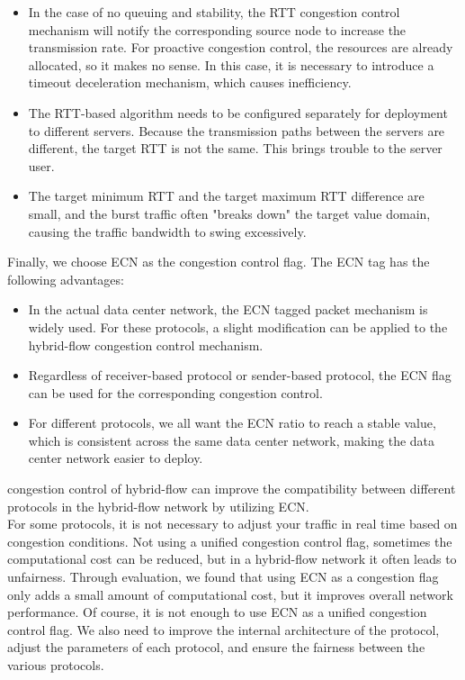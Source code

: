 \documentclass[conference]{IEEEtran}
\begin{document}
\begin{itemize}
\item  In the case of no queuing and stability, the RTT congestion control mechanism will notify the corresponding source node to increase the transmission rate. For proactive congestion control, the resources are already allocated, so it makes no sense. In this case, it is necessary to introduce a timeout deceleration mechanism, which causes inefficiency.
\item The RTT-based algorithm needs to be configured separately for deployment to different servers. Because the transmission paths between the servers are different, the target RTT is not the same. This brings trouble to the server user.
\item The target minimum RTT and the target maximum RTT difference are small, and the burst traffic often "breaks down" the target value domain, causing the traffic bandwidth to swing excessively.
\end{itemize}
\indent Finally, we choose ECN as the congestion control flag. The ECN tag has the following advantages:
\begin{itemize}
\item In the actual data center network, the ECN tagged packet mechanism is widely used. For these protocols, a slight modification can be applied to the hybrid-flow congestion control mechanism.
\item Regardless of receiver-based protocol or sender-based protocol, the ECN flag can be used for the corresponding congestion control.
\item For different protocols, we all want the ECN ratio to reach a stable value, which is consistent across the same data center network, making the data center network easier to deploy.
\end{itemize}
\indent congestion control of hybrid-flow can improve the compatibility between different protocols in the hybrid-flow network by utilizing ECN.\\
\indent For some protocols, it is not necessary to adjust your traffic in real time based on congestion conditions. Not using a unified congestion control flag, sometimes the computational cost can be reduced, but in a hybrid-flow network it often leads to unfairness. Through evaluation, we found that using ECN as a congestion flag only adds a small amount of computational cost, but it improves overall network performance. Of course, it is not enough to use ECN as a unified congestion control flag. We also need to improve the internal architecture of the protocol, adjust the parameters of each protocol, and ensure the fairness between the various protocols.
\end{document}
